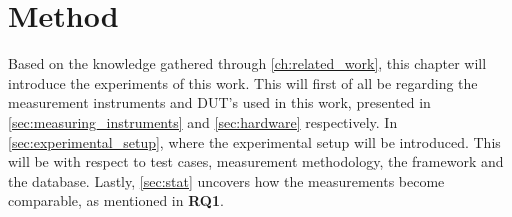 \chapter{Method}\label{ch:method}

Based on the knowledge gathered through \cref{ch:related_work}, this chapter will introduce the experiments of this work. This will first of all be regarding the measurement instruments and DUT's used in this work, presented in \cref{sec:measuring_instruments} and \cref{sec:hardware} respectively. In \cref{sec:experimental_setup}, where the experimental setup will be introduced. This will be with respect to test cases, measurement methodology, the framework and the database. Lastly, \cref{sec:stat} uncovers how the measurements become comparable, as mentioned in \textbf{RQ1}.







% 
% 



